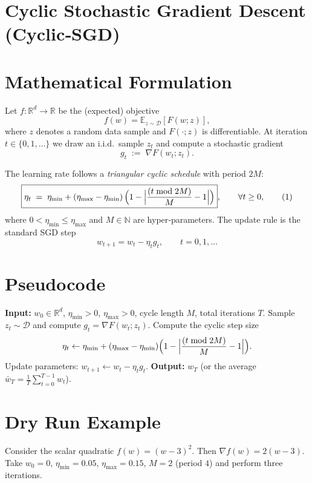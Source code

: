 \documentclass{article}
\newcommand{\EE}{\mathbb{E}}
\newcommand{\RR}{\mathbb{R}}
\begin{document}
\section*{Cyclic Stochastic Gradient Descent (Cyclic‑SGD)}

\section*{Mathematical Formulation}
Let $f:\RR^{d}\rightarrow\RR$ be the (expected) objective
\[
f(w)=\EE_{z\sim\mathcal{D}}[F(w;z)],
\]
where $z$ denotes a random data sample and $F(\cdot;z)$ is differentiable.
At iteration $t\in\{0,1,\dots\}$ we draw an i.i.d.\ sample $z_t$ and compute a stochastic gradient
\[
g_t \;:=\; \nabla F(w_t;z_t).
\]

The learning rate follows a \emph{triangular cyclic schedule} with period $2M$:
\[
\boxed{
\eta_t \;=\; \eta_{\min}+(\eta_{\max}-\eta_{\min})\,
\Bigl(1-\Bigl|\frac{(t\bmod 2M)}{M}-1\Bigr|\Bigr)},
\qquad\forall t\ge0,
\tag{1}
\]
where $0<\eta_{\min}\le\eta_{\max}$ and $M\in\mathbb{N}$ are hyper‑parameters.
The update rule is the standard SGD step
\[
\boxed{w_{t+1}=w_t-\eta_t g_t},\qquad t=0,1,\dots
\tag{2}
\]

\section*{Pseudocode}
\begin{algorithm}[H]
\caption{Cyclic‑SGD}
\begin{algorithmic}[1]
\STATE \textbf{Input:} $w_0\in\RR^{d}$, $\eta_{\min}>0$, $\eta_{\max}>0$, cycle length $M$, total iterations $T$.
    \STATE Sample $z_t\sim\mathcal{D}$ and compute $g_t=\nabla F(w_t;z_t)$.
    \STATE Compute the cyclic step size
    \[
    \eta_t\gets \eta_{\min}+(\eta_{\max}-\eta_{\min})\Bigl(1-\Bigl|\frac{(t\bmod 2M)}{M}-1\Bigr|\Bigr).
    \]
    \STATE Update parameters: $w_{t+1}\gets w_t-\eta_t g_t$.
\ENDFOR
\STATE \textbf{Output:} $w_T$ (or the average $\bar w_T=\frac1T\sum_{t=0}^{T-1}w_t$).
\end{algorithmic}
\end{algorithm}

\section*{Dry Run Example}
Consider the scalar quadratic $f(w)=(w-3)^2$.
Then $\nabla f(w)=2(w-3)$.  
Take $w_0=0$, $\eta_{\min}=0.05$, $\eta_{\max}=0.15$, $M=2$ (period $4$) and perform three iterations.
\end{document}
